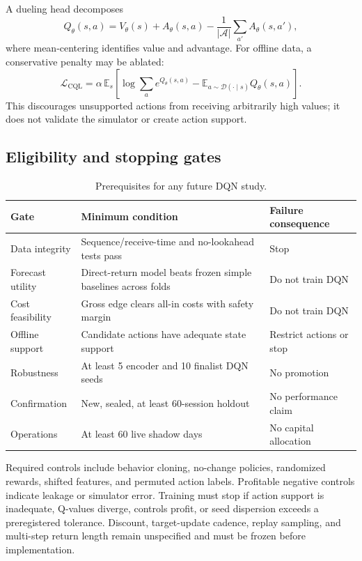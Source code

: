 \documentclass[10pt,letterpaper]{article}
\numberwithin{equation}{section}
\newcommand{\E}{\mathbb{E}}
\theoremstyle{definition}
\theoremstyle{remark}
\begin{document}
A dueling head decomposes
\begin{equation}
Q_\theta(s,a)=V_\theta(s)+A_\theta(s,a)
-\frac{1}{|\mathcal{A}|}\sum_{a'}A_\theta(s,a'),
\label{eq:dueling}
\end{equation}
where mean-centering identifies value and advantage. For offline data, a
conservative penalty may be ablated:
\begin{equation}
\mathcal{L}_{\mathrm{CQL}}
=\alpha\,
\E_s\!\left[
\log\sum_a e^{Q_\theta(s,a)}
-\E_{a\sim\mathcal{D}(\cdot\mid s)}Q_\theta(s,a)
\right].
\label{eq:cql}
\end{equation}
This discourages unsupported actions from receiving arbitrarily high values;
it does not validate the simulator or create action support.

\subsection{Eligibility and stopping gates}

\begin{table}[!htbp]
\centering
\small
\begin{tabularx}{\textwidth}{@{}Y Y Y@{}}
\toprule
\textbf{Gate} & \textbf{Minimum condition} & \textbf{Failure consequence}\\
\midrule
Data integrity & Sequence/receive-time and no-lookahead tests pass & Stop\\
Forecast utility & Direct-return model beats frozen simple baselines across
folds & Do not train DQN\\
Cost feasibility & Gross edge clears all-in costs with safety margin & Do not
train DQN\\
Offline support & Candidate actions have adequate state support & Restrict
actions or stop\\
Robustness & At least 5 encoder and 10 finalist DQN seeds & No promotion\\
Confirmation & New, sealed, at least 60-session holdout & No performance claim\\
Operations & At least 60 live shadow days & No capital allocation\\
\bottomrule
\end{tabularx}
\caption{Prerequisites for any future DQN study.}
\label{tab:dqn-gates}
\end{table}

Required controls include behavior cloning, no-change policies, randomized
rewards, shifted features, and permuted action labels. Profitable negative
controls indicate leakage or simulator error. Training must stop if action
support is inadequate, Q-values diverge, controls profit, or seed dispersion
exceeds a preregistered tolerance. Discount, target-update cadence, replay
sampling, and multi-step return length remain unspecified and must be frozen
before implementation.
\end{document}
